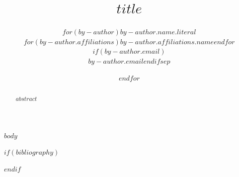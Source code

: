 \documentclass[letterpaper,twocolumn,10pt]{article}
\begin{document}

\date{}

\title{\Large \bf $title$}

\author{%
$for(by-author)${\rm $by-author.name.literal$}\\$for(by-author.affiliations)$$by-author.affiliations.name$$endfor$$if(by-author.email)$\\\texttt{$by-author.email$}$endif$$sep$\and$endfor$%
}

\maketitle

\begin{abstract}
$abstract$
\end{abstract}

$body$

\cleardoublepage

$if(bibliography)$

$endif$

\end{document}
